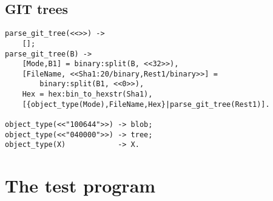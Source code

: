 \documentclass[12pt]{hitec}
\begin{document}
\subsection{GIT trees}

\begin{Verbatim}[frame=single]
parse_git_tree(<<>>) ->
    [];
parse_git_tree(B) ->
    [Mode,B1] = binary:split(B, <<32>>),
    [FileName, <<Sha1:20/binary,Rest1/binary>>] = 
        binary:split(B1, <<0>>),
    Hex = hex:bin_to_hexstr(Sha1),
    [{object_type(Mode),FileName,Hex}|parse_git_tree(Rest1)].
    
object_type(<<"100644">>) -> blob;
object_type(<<"040000">>) -> tree;
object_type(X)            -> X.
\end{Verbatim}


\section{The test program}

\end{document}
